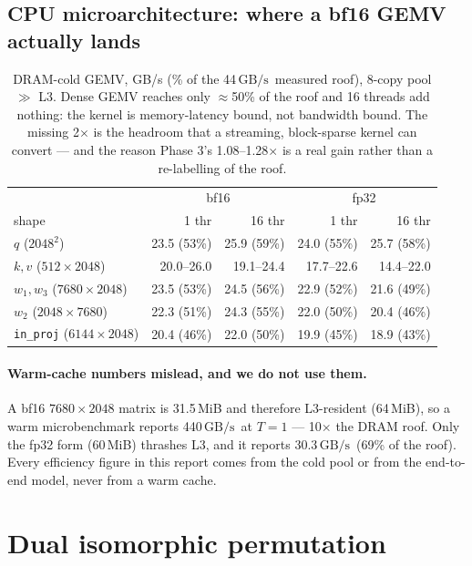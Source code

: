 \documentclass[11pt]{article}
\newcommand{\code}[1]{\texttt{\small #1}}
\newcommand{\gbps}{\ensuremath{\,\mathrm{GB/s}}}
\begin{document}
\subsection{CPU microarchitecture: where a bf16 GEMV actually lands}
\begin{table}[h]\centering\small
\setlength{\tabcolsep}{4pt}
\begin{tabular}{lrrrr}
\toprule
 & \multicolumn{2}{c}{bf16} & \multicolumn{2}{c}{fp32} \\
shape & 1 thr & 16 thr & 1 thr & 16 thr \\
\midrule
$q$ ($2048^2$) & 23.5 (53\%) & 25.9 (59\%) & 24.0 (55\%) & 25.7 (58\%) \\
$k,v$ ($512{\times}2048$) & 20.0--26.0 & 19.1--24.4 & 17.7--22.6 & 14.4--22.0 \\
$w_1,w_3$ ($7680{\times}2048$) & 23.5 (53\%) & 24.5 (56\%) & 22.9 (52\%) & 21.6 (49\%) \\
$w_2$ ($2048{\times}7680$) & 22.3 (51\%) & 24.3 (55\%) & 22.0 (50\%) & 20.4 (46\%) \\
\code{in\_proj} ($6144{\times}2048$) & 20.4 (46\%) & 22.0 (50\%) & 19.9 (45\%) & 18.9 (43\%) \\
\bottomrule
\end{tabular}
\caption{DRAM-cold GEMV, GB/s (\% of the 44\gbps\ measured roof), 8-copy pool $\gg$ L3.
Dense GEMV reaches only $\approx$50\% of the roof and 16 threads add nothing: the kernel is
memory-latency bound, not bandwidth bound. The missing 2$\times$ is the headroom that a
streaming, block-sparse kernel can convert --- and the reason Phase 3's 1.08--1.28$\times$
is a real gain rather than a re-labelling of the roof.}
\end{table}

\paragraph{Warm-cache numbers mislead, and we do not use them.} A bf16 $7680{\times}2048$
matrix is 31.5\,MiB and therefore L3-resident (64\,MiB), so a warm microbenchmark reports
440\gbps\ at $T{=}1$ --- 10$\times$ the DRAM roof. Only the fp32 form ($60\,$MiB) thrashes
L3, and it reports 30.3\gbps\ (69\% of the roof). Every efficiency figure in this report
comes from the cold pool or from the end-to-end model, never from a warm cache.

\section{Dual isomorphic permutation}
\end{document}
